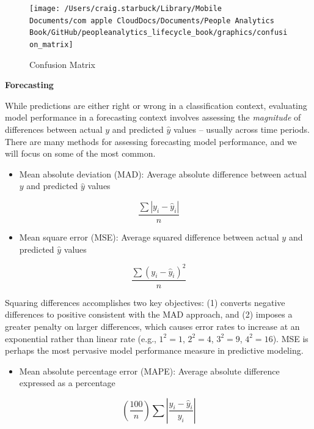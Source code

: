 \documentclass[
]{book}
\providecommand{\tightlist}{%
  \setlength{\itemsep}{0pt}\setlength{\parskip}{0pt}}
\begin{document}
\begin{figure}

{\centering \texttt{[image: /Users/craig.starbuck/Library/Mobile Documents/com~apple~CloudDocs/Documents/People Analytics Book/GitHub/peopleanalytics\_lifecycle\_book/graphics/confusion\_matrix]} 

}

\caption{Confusion Matrix}\label{fig:confusion-mtx}
\end{figure}

\textbf{Forecasting}

While predictions are either right or wrong in a classification context, evaluating model performance in a forecasting context involves assessing the \emph{magnitude} of differences between actual \(y\) and predicted \(\hat y\) values -- usually across time periods. There are many methods for assessing forecasting model performance, and we will focus on some of the most common.

\begin{itemize}
\tightlist
\item
  Mean absolute deviation (MAD): Average absolute difference between actual \(y\) and predicted \(\hat y\) values
\end{itemize}

\[ \frac{\sum|y_i - \hat y_i|}{n} \]

\begin{itemize}
\tightlist
\item
  Mean square error (MSE): Average squared difference between actual \(y\) and predicted \(\hat y\) values
\end{itemize}

\[ \frac{\sum(y_i - \hat y_i)^2}{n} \]

Squaring differences accomplishes two key objectives: (1) converts negative differences to positive consistent with the MAD approach, and (2) imposes a greater penalty on larger differences, which causes error rates to increase at an exponential rather than linear rate (e.g., \(1^2 = 1\), \(2^2 = 4\), \(3^2 = 9\), \(4^2 = 16\)). MSE is perhaps the most pervasive model performance measure in predictive modeling.

\begin{itemize}
\tightlist
\item
  Mean absolute percentage error (MAPE): Average absolute difference expressed as a percentage
\end{itemize}

\[ (\frac{100}{n})\sum|\frac{y_i - \hat y_i}{y_i}| \]
\end{document}
